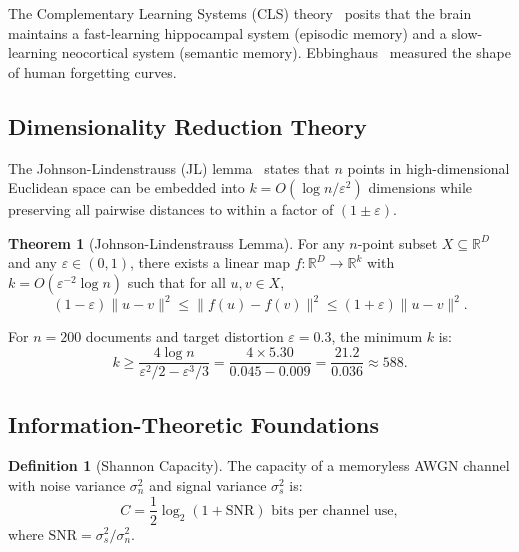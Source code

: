 \documentclass[12pt,a4paper]{article}
\theoremstyle{definition}
\newtheorem{theorem}{Theorem}[section]
\newtheorem{definition}{Definition}[section]
\theoremstyle{remark}
\newcommand{\R}{\mathbb{R}}
\newcommand{\SNR}{\mathrm{SNR}}
\begin{document}
The Complementary Learning Systems (CLS) theory~\cite{mcclelland1995} posits that the brain maintains a fast-learning hippocampal system (episodic memory) and a slow-learning neocortical system (semantic memory). Ebbinghaus~\cite{ebbinghaus1885} measured the shape of human forgetting curves.

\subsection{Dimensionality Reduction Theory}

The Johnson-Lindenstrauss (JL) lemma~\cite{johnson1984} states that $n$ points in high-dimensional Euclidean space can be embedded into $k = O(\log n / \varepsilon^2)$ dimensions while preserving all pairwise distances to within a factor of $(1 \pm \varepsilon)$.

\begin{theorem}[Johnson-Lindenstrauss Lemma]
\label{thm:jl}
For any $n$-point subset $X \subseteq \R^D$ and any $\varepsilon \in (0, 1)$, there exists a linear map $f: \R^D \to \R^k$ with $k = O(\varepsilon^{-2} \log n)$ such that for all $u, v \in X$,
\begin{equation}
    (1 - \varepsilon) \|u - v\|^2 \le \|f(u) - f(v)\|^2 \le (1 + \varepsilon) \|u - v\|^2.
\end{equation}
\end{theorem}

For $n = 200$ documents and target distortion $\varepsilon = 0.3$, the minimum $k$ is:
\begin{equation}
    k \ge \frac{4 \log n}{\varepsilon^2/2 - \varepsilon^3/3} = \frac{4 \times 5.30}{0.045 - 0.009} = \frac{21.2}{0.036} \approx 588.
\end{equation}

\subsection{Information-Theoretic Foundations}

\begin{definition}[Shannon Capacity]
The capacity of a memoryless AWGN channel with noise variance $\sigma_n^2$ and signal variance $\sigma_s^2$ is:
\begin{equation}
    C = \frac{1}{2} \log_2(1 + \SNR) \text{ bits per channel use},
\end{equation}
where $\SNR = \sigma_s^2 / \sigma_n^2$.
\end{definition}
\end{document}
